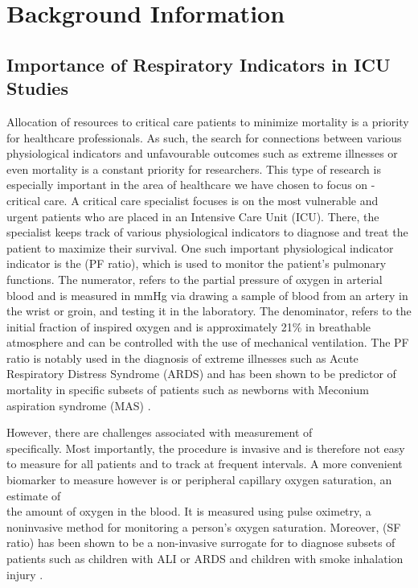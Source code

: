 
\chapter{Background Information} %

\label{chapter1} %


\section{Importance of Respiratory Indicators in ICU Studies}

Allocation of resources to critical care patients to minimize mortality is a priority for healthcare professionals. As such, the search for connections between various physiological indicators and unfavourable outcomes such as extreme illnesses or even mortality is a constant priority for researchers. This type of research is especially important in the area of healthcare we have chosen to focus on - critical care. A critical care specialist focuses is on the most vulnerable and urgent patients who are placed in an Intensive Care Unit (ICU). There, the specialist keeps track of various physiological indicators to diagnose and treat the patient to maximize their survival. One such important physiological indicator indicator is the  \PF(PF ratio), which is used to monitor the patient's pulmonary functions. The numerator, \Pa refers to the partial pressure of oxygen in arterial blood and is measured in mmHg via drawing a sample of blood from an artery in the wrist or groin, and testing it in the laboratory. The denominator, \Fi refers to the initial fraction of inspired oxygen and is approximately 21\% in breathable atmosphere and can be controlled with the use of mechanical ventilation. The PF ratio is notably used in the diagnosis of extreme illnesses such as Acute Respiratory Distress Syndrome (ARDS) and has been shown to be predictor of mortality in specific subsets of patients such as newborns with Meconium aspiration syndrome (MAS)  \citep{narayanan2019pao2}.

However, there are challenges associated with measurement of \Pa  \\ specifically. Most importantly, the procedure is invasive and is therefore not easy to measure for all patients and to track at frequent intervals. A more convenient biomarker to measure however is \Sp  or peripheral capillary oxygen saturation, an estimate of\\
 the amount of oxygen in the blood. It is measured using pulse oximetry, a noninvasive method for monitoring a person's oxygen saturation. Moreover, \SF (SF ratio) has been shown to be a non-invasive surrogate for \PF to diagnose subsets of patients such as children with ALI or ARDS \citep{rice2007comparison} and children with smoke inhalation injury \citep{cambiaso2017correlation}. 

